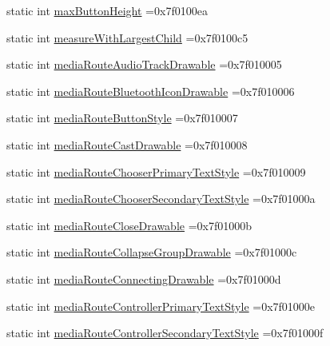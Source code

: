 \begin{DoxyCompactItemize}
static int \hyperlink{classandroid_1_1support_1_1v7_1_1recyclerview_1_1R_1_1attr_a6d9b57f95f65fa9612d1b5bcb02fbaa1}{max\+Button\+Height} =0x7f0100ea
\item 
static int \hyperlink{classandroid_1_1support_1_1v7_1_1recyclerview_1_1R_1_1attr_a4fb10290c925ace1bca08d51cedbf11a}{measure\+With\+Largest\+Child} =0x7f0100c5
\item 
static int \hyperlink{classandroid_1_1support_1_1v7_1_1recyclerview_1_1R_1_1attr_ad836cb313295e5092e4a8b7e7f471585}{media\+Route\+Audio\+Track\+Drawable} =0x7f010005
\item 
static int \hyperlink{classandroid_1_1support_1_1v7_1_1recyclerview_1_1R_1_1attr_a1ec897bb4878a970403311bc5070f5e9}{media\+Route\+Bluetooth\+Icon\+Drawable} =0x7f010006
\item 
static int \hyperlink{classandroid_1_1support_1_1v7_1_1recyclerview_1_1R_1_1attr_a360e6f13a54781f28055d554369e429e}{media\+Route\+Button\+Style} =0x7f010007
\item 
static int \hyperlink{classandroid_1_1support_1_1v7_1_1recyclerview_1_1R_1_1attr_a9f5d157b4cefd543130871054280d5d8}{media\+Route\+Cast\+Drawable} =0x7f010008
\item 
static int \hyperlink{classandroid_1_1support_1_1v7_1_1recyclerview_1_1R_1_1attr_a820f715cc74b3ff175cb6fc8e156dd5b}{media\+Route\+Chooser\+Primary\+Text\+Style} =0x7f010009
\item 
static int \hyperlink{classandroid_1_1support_1_1v7_1_1recyclerview_1_1R_1_1attr_ab001905422b96f358d74d7db57c4bcf7}{media\+Route\+Chooser\+Secondary\+Text\+Style} =0x7f01000a
\item 
static int \hyperlink{classandroid_1_1support_1_1v7_1_1recyclerview_1_1R_1_1attr_af3f86f64a75718f916fba35304a25b95}{media\+Route\+Close\+Drawable} =0x7f01000b
\item 
static int \hyperlink{classandroid_1_1support_1_1v7_1_1recyclerview_1_1R_1_1attr_ae6ae4f5c0b73283706d3a9f5848905c4}{media\+Route\+Collapse\+Group\+Drawable} =0x7f01000c
\item 
static int \hyperlink{classandroid_1_1support_1_1v7_1_1recyclerview_1_1R_1_1attr_a28833557419b1b6f2f77ddd451851174}{media\+Route\+Connecting\+Drawable} =0x7f01000d
\item 
static int \hyperlink{classandroid_1_1support_1_1v7_1_1recyclerview_1_1R_1_1attr_a79442b4f29e66150b72c9d2b38452446}{media\+Route\+Controller\+Primary\+Text\+Style} =0x7f01000e
\item 
static int \hyperlink{classandroid_1_1support_1_1v7_1_1recyclerview_1_1R_1_1attr_aff6b0a3c6f692d579a21cd72440945b9}{media\+Route\+Controller\+Secondary\+Text\+Style} =0x7f01000f

\end{DoxyCompactItemize}
